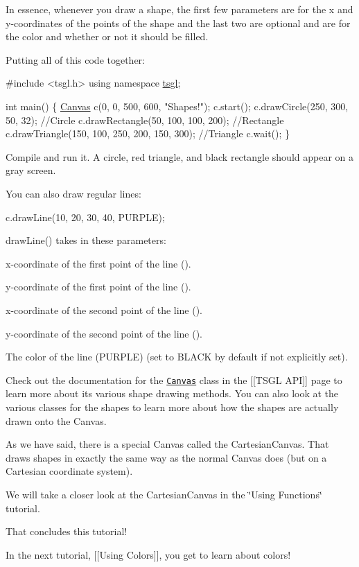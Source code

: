 In essence, whenever you draw a shape, the first few parameters are for the x and y-\/coordinates of the points of the shape and the last two are optional and are for the color and whether or not it should be filled.

Putting all of this code together\+:


\begin{DoxyCode}
\textcolor{preprocessor}{#include <tsgl.h>}
\textcolor{keyword}{using namespace }\hyperlink{namespacetsgl}{tsgl};

\textcolor{keywordtype}{int} main() \{
  \hyperlink{classtsgl_1_1_canvas}{Canvas} c(0, 0, 500, 600, \textcolor{stringliteral}{"Shapes!"});
  c.start();
  c.drawCircle(250, 300, 50, 32);  \textcolor{comment}{//Circle}
  c.drawRectangle(50, 100, 100, 200);  \textcolor{comment}{//Rectangle}
  c.drawTriangle(150, 100, 250, 200, 150, 300);  \textcolor{comment}{//Triangle}
  c.wait();
\}
\end{DoxyCode}


Compile and run it. A circle, red triangle, and black rectangle should appear on a gray screen.

You can also draw regular lines\+:


\begin{DoxyCode}
c.drawLine(10, 20, 30, 40, PURPLE);
\end{DoxyCode}


draw\+Line() takes in these parameters\+:


\begin{DoxyItemize}
\item x-\/coordinate of the first point of the line ({}).
\item y-\/coordinate of the first point of the line ({}).
\item x-\/coordinate of the second point of the line ({}).
\item y-\/coordinate of the second point of the line ({}).
\item The color of the line ({\ttfamily P\+U\+R\+P\+L\+E}) (set to {\ttfamily B\+L\+A\+C\+K} by default if not explicitly set).
\end{DoxyItemize}

Check out the documentation for the \href{http://calvin-cs.github.io/TSGL/html/_canvas_8h_source.html}{\tt Canvas} class in the \mbox{[}\mbox{[}T\+S\+G\+L A\+P\+I\mbox{]}\mbox{]} page to learn more about its various shape drawing methods. You can also look at the various classes for the shapes to learn more about how the shapes are actually drawn onto the Canvas.

As we have said, there is a special Canvas called the Cartesian\+Canvas. That draws shapes in exactly the same way as the normal Canvas does (but on a Cartesian coordinate system).

We will take a closer look at the Cartesian\+Canvas in the \char`\"{}\+Using Functions\char`\"{} tutorial.

That concludes this tutorial!

In the next tutorial, \mbox{[}\mbox{[}Using Colors\mbox{]}\mbox{]}, you get to learn about colors! 